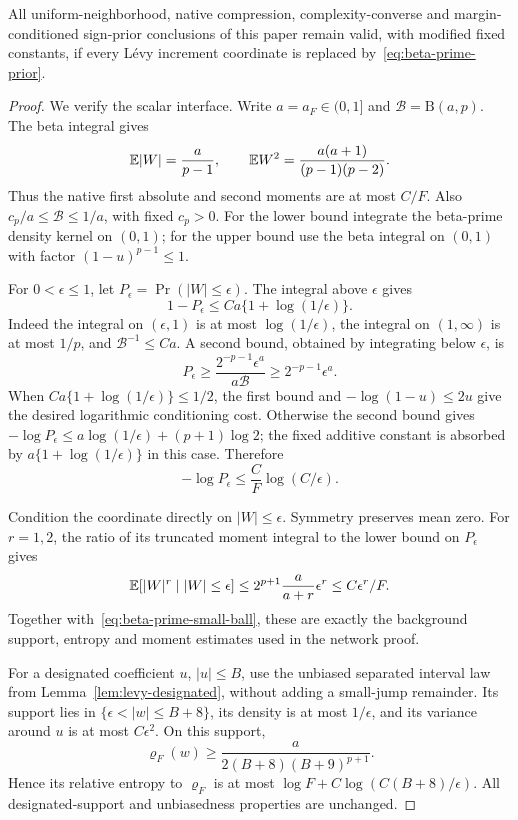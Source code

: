 \begin{proposition}
\label{prop:beta-prime}
All uniform-neighborhood, native compression, complexity-converse and margin-conditioned sign-prior conclusions of this paper remain valid, with modified fixed constants, if every L\'evy increment coordinate is replaced by~\eqref{eq:beta-prime-prior}.
\end{proposition}
\begin{proof}
We verify the scalar interface. Write $a=a_F\in(0,1]$ and
$\mathcal B=\mathrm B(a,p)$. The beta integral gives
\[
 \mathbb E|W|=\frac{a}{p-1},\qquad
 \mathbb E W^2=\frac{a(a+1)}{(p-1)(p-2)}.
\]
Thus the native first absolute and second moments are at most $C/F$.
Also $c_p/a\le\mathcal B\le1/a$, with fixed $c_p>0$. For the lower bound integrate the beta-prime density kernel on $(0,1)$; for the upper bound use the beta integral on $(0,1)$ with factor $(1-u)^{p-1}\le1$.

For $0<\epsilon\le1$, let $P_\epsilon=\Pr(|W|\le\epsilon)$.
The integral above $\epsilon$ gives
\[
 1-P_\epsilon\le Ca\{1+\log(1/\epsilon)\}.
\]
Indeed the integral on $(\epsilon,1)$ is at most
$\log(1/\epsilon)$, the integral on $(1,\infty)$ is at most $1/p$,
and $\mathcal B^{-1}\le Ca$.
A second bound, obtained by integrating below $\epsilon$, is
\[
 P_\epsilon\ge
 \frac{2^{-p-1}\epsilon^a}{a\mathcal B}
 \ge2^{-p-1}\epsilon^a.
\]
When $Ca\{1+\log(1/\epsilon)\}\le1/2$, the first bound and
$-\log(1-u)\le2u$ give the desired logarithmic conditioning cost.
Otherwise the second bound gives
$-\log P_\epsilon\le a\log(1/\epsilon)+(p+1)\log2$;
the fixed additive constant is absorbed by
$a\{1+\log(1/\epsilon)\}$ in this case. Therefore
\begin{equation}
 -\log P_\epsilon\le\frac C F\log(C/\epsilon).
 \label{eq:beta-prime-small-ball}
\end{equation}

Condition the coordinate directly on $|W|\le\epsilon$.
Symmetry preserves mean zero. For $r=1,2$, the ratio of its truncated moment integral to the lower bound on $P_\epsilon$ gives
\[
 \mathbb E[|W|^r\mid |W|\le\epsilon]
 \le 2^{p+1}\frac{a}{a+r}\epsilon^r
 \le C\epsilon^r/F.
\]
Together with~\eqref{eq:beta-prime-small-ball}, these are exactly the background support, entropy and moment estimates used in the network proof.

For a designated coefficient $u$, $|u|\le B$, use the unbiased separated interval law from Lemma~\ref{lem:levy-designated}, without adding a small-jump remainder. Its support lies in
$\{\epsilon<|w|\le B+8\}$, its density is at most $1/\epsilon$,
and its variance around $u$ is at most $C\epsilon^2$.
On this support,
\[
 \varrho_F(w)\ge
 \frac{a}{2(B+8)(B+9)^{p+1}}.
\]
Hence its relative entropy to $\varrho_F$ is at most
$\log F+C\log(C(B+8)/\epsilon)$.
All designated-support and unbiasedness properties are unchanged.


\end{proof}
